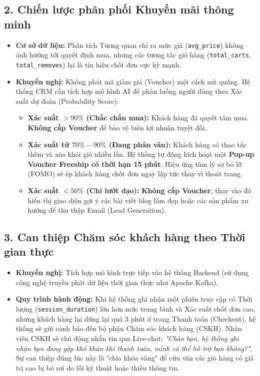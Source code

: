 \documentclass[a4paper,11pt]{article}
\begin{document}
\subsection*{2. Chiến lược phân phối Khuyến mãi thông minh }
\begin{itemize}[itemsep=4pt, leftmargin=*]
    \item \textbf{Cơ sở dữ liệu:} Phân tích Tương quan chỉ ra mức giá (\texttt{avg\_price}) không ảnh hưởng tới quyết định mua, nhưng các tương tác giỏ hàng (\texttt{total\_carts}, \texttt{total\_removes}) lại là tín hiệu chốt đơn cực kỳ mạnh.
    \item \textbf{Khuyến nghị:} Không phát mã giảm giá (Voucher) một cách mù quáng. Hệ thống CRM cần tích hợp mô hình AI để phân luồng người dùng theo Xác suất dự đoán (Probability Score):
    \begin{itemize}
        \item \textbf{Xác suất $> 90\%$ (Chắc chắn mua):} Khách hàng đã quyết tâm mua. \textbf{Không cấp Voucher} để bảo vệ biên lợi nhuận tuyệt đối.
        \item \textbf{Xác suất từ $70\% - 90\%$ (Đang phân vân):} Khách hàng có thao tác thêm và xóa khỏi giỏ nhiều lần. Hệ thống tự động kích hoạt một \textbf{Pop-up Voucher Freeship có thời hạn 15 phút}. Hiệu ứng tâm lý sợ bỏ lỡ (FOMO) sẽ ép khách hàng chốt đơn ngay lập tức thay vì thoát trang.
        \item \textbf{Xác suất $< 50\%$ (Chỉ lướt dạo):} \textbf{Không cấp Voucher}, thay vào đó hiển thị giao diện gợi ý các bài viết blog làm đẹp hoặc các sản phẩm xu hướng để thu thập Email (Lead Generation).
    \end{itemize}
\end{itemize}

\subsection*{3. Can thiệp Chăm sóc khách hàng theo Thời gian thực }
\begin{itemize}[itemsep=4pt, leftmargin=*]
    \item \textbf{Khuyến nghị:} Tích hợp mô hình trực tiếp vào hệ thống Backend (sử dụng công nghệ truyền phát dữ liệu thời gian thực như Apache Kafka). 
    \item \textbf{Quy trình hành động:} Khi hệ thống ghi nhận một phiên truy cập có Thời lượng (\texttt{session\_duration}) lớn hơn mức trung bình và Xác suất chốt đơn cao, nhưng khách hàng lại dừng lại quá 3 phút ở trang Thanh toán (Checkout), hệ thống sẽ gửi cảnh báo đến bộ phận Chăm sóc khách hàng (CSKH). Nhân viên CSKH sẽ chủ động nhắn tin qua Live-chat: \textit{"Chào bạn, hệ thống ghi nhận bạn đang gặp khó khăn khi thanh toán, mình có thể hỗ trợ bạn không?"}. Sự can thiệp đúng lúc này là "chìa khóa vàng" để cứu vãn các giỏ hàng có giá trị cao bị bỏ rơi do lỗi kỹ thuật hoặc thiếu thông tin.
\end{itemize}
\end{document}
